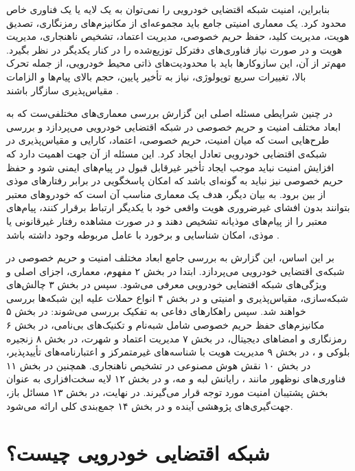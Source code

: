 \documentclass[12pt,a4paper]{article}
\begin{document}
بنابراین، امنیت شبکه اقتضایی خودرویی را نمی‌توان به یک لایه یا یک فناوری خاص محدود کرد. یک معماری امنیتی جامع باید مجموعه‌ای از مکانیزم‌های رمزنگاری، تصدیق هویت، مدیریت کلید، حفظ حریم خصوصی، مدیریت اعتماد، تشخیص ناهنجاری، مدیریت هویت و در صورت نیاز فناوری‌های دفترکل توزیع‌شده را در کنار یکدیگر در نظر بگیرد. مهم‌تر از آن، این سازوکارها باید با محدودیت‌های ذاتی محیط خودرویی، از جمله تحرک بالا، تغییرات سریع توپولوژی، نیاز به تأخیر پایین، حجم بالای پیام‌ها و الزامات مقیاس‌پذیری سازگار باشند \cite{farsimadanReviewSecurityChallenges2025,rahmawatiagustinaSystematicLiteratureReview2025}.

در چنین شرایطی مسئله اصلی این گزارش بررسی معماری‌های مختلفی‌ست که به ابعاد مختلف امنیت و حریم خصوصی در شبکه اقتضایی خودرویی می‌پردازد و بررسی طرح‌هایی است که میان امنیت، حریم خصوصی، اعتماد، کارایی و مقیاس‌پذیری در شبکه‌ی اقتضایی خودرویی تعادل ایجاد کرد. این مسئله از آن جهت اهمیت دارد که افزایش امنیت نباید موجب ایجاد تأخیر غیرقابل قبول در پیام‌های ایمنی شود و حفظ حریم خصوصی نیز نباید به گونه‌ای باشد که امکان پاسخگویی در برابر رفتارهای موذی از بین برود. به بیان دیگر، هدف یک معماری مناسب آن است که خودروهای معتبر بتوانند بدون افشای غیرضروری هویت واقعی خود با یکدیگر ارتباط برقرار کنند، پیام‌های معتبر را از پیام‌های موذیانه تشخیص دهند و در صورت مشاهده رفتار غیرقانونی یا موذی، امکان شناسایی و برخورد با عامل مربوطه وجود داشته باشد \cite{rahmawatiagustinaSystematicLiteratureReview2025,VanetSecurityPrivacy}.

بر این اساس، این گزارش به بررسی جامع ابعاد مختلف امنیت و حریم خصوصی در شبکه‌ی اقتضایی خودرویی می‌پردازد. ابتدا در بخش ۲ مفهوم، معماری، اجزای اصلی و ویژگی‌های شبکه اقتضایی خودرویی معرفی می‌شود. سپس در بخش ۳ چالش‌های شبکه‌سازی، مقیاس‌پذیری و امنیتی و در بخش ۴ انواع حملات علیه این شبکه‌ها بررسی خواهند شد. سپس راهکارهای دفاعی به تفکیک بررسی می‌شوند: در بخش ۵ مکانیزم‌های حفظ حریم خصوصی شامل شبه‌نام و تکنیک‌های بی‌نامی، در بخش ۶ رمزنگاری و امضاهای دیجیتال، در بخش ۷ مدیریت اعتماد و شهرت، در بخش ۸ زنجیره بلوکی و ، در بخش ۹ مدیریت هویت با شناسه‌های غیرمتمرکز و اعتبارنامه‌های تأییدپذیر، در بخش ۱۰ نقش هوش مصنوعی در تشخیص ناهنجاری. همچنین در بخش ۱۱ فناوری‌های نوظهور مانند ، رایانش لبه و مه، و در بخش ۱۲ لایه سخت‌افزاری به عنوان بخش پشتیبان امنیت مورد توجه قرار می‌گیرند. در نهایت،  در بخش ۱۳ مسائل باز، جهت‌گیری‌های پژوهشی آینده و در بخش ۱۴ جمع‌بندی کلی ارائه می‌شود.

\section{شبکه اقتضایی خودرویی چیست؟}
\end{document}
